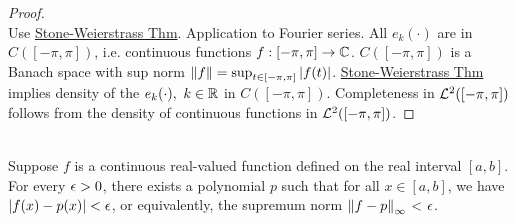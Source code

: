 \begin{examples}
\begin{enumerate}[label = (\alph*)]
    \begin{proof}\ \\
    Use \underline{Stone-Weierstrass Thm}. Application to Fourier series. All $e_k(\cdot)$ are in $C([-\pi,\pi])$, i.e. continuous functions $f: [-\pi,\pi] \to \mathbb{C}$. $C([-\pi,\pi])$ is a Banach space with sup norm $\norm{f} = \sup_{t \in [-\pi,\pi]} \abs{f(t)}$. \underline{Stone-Weierstrass Thm} implies density of the $e_k(\cdot),\ k \in \mathbb{R}$ in $C([-\pi,\pi])$. Completeness in $\mathcal{L}^2([-\pi,\pi])$ follows from the density of continuous functions in $\mathcal{L}^2([-\pi,\pi])$. 
    \end{proof}
    \begin{remark}\ \\
    Suppose $f$ is a continuous real-valued function defined on the real interval $[a, b]$. For every $\epsilon > 0$, there exists a polynomial $p$ such that for all $x \in [a,b]$, we have $\abs{f(x) - p(x)} < \epsilon$, or equivalently, the supremum norm $\norm{f - p}_\infty$ < $\epsilon$.
    \end{remark}
\end{enumerate}
\end{examples}













